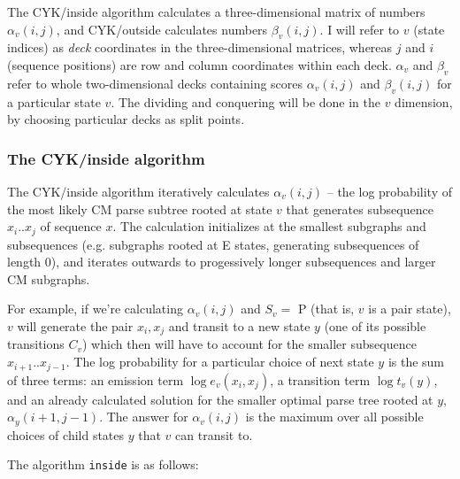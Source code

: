 \documentclass[11pt]{article}
\begin{document}
The CYK/inside algorithm calculates a three-dimensional matrix of
numbers $\alpha_v(i,j)$, and CYK/outside calculates numbers
$\beta_v(i,j)$. I will refer to $v$ (state indices) as \emph{deck}
coordinates in the three-dimensional matrices, whereas $j$ and $i$
(sequence positions) are row and column coordinates within each deck.
$\alpha_{v}$ and $\beta_{v}$ refer to whole two-dimensional decks
containing scores $\alpha_v(i,j)$ and $\beta_v(i,j)$ for a particular
state $v$. The dividing and conquering will be done in the $v$
dimension, by choosing particular decks as split points.

\subsubsection{The CYK/inside algorithm}

The CYK/inside algorithm iteratively calculates $\alpha_v(i,j)$ -- the
log probability of the most likely CM parse subtree rooted at state
$v$ that generates subsequence $x_i..x_j$ of sequence $x$. The
calculation initializes at the smallest subgraphs and subsequences
(e.g. subgraphs rooted at E states, generating subsequences of length
0), and iterates outwards to progessively longer subsequences and
larger CM subgraphs.

For example, if we're calculating $\alpha_v(i,j)$ and $S_v =$ P (that
is, $v$ is a pair state), $v$ will generate the pair $x_i,x_j$ and
transit to a new state $y$ (one of its possible transitions $C_v$)
which then will have to account for the smaller subsequence
$x_{i+1}..x_{j-1}$. The log probability for a particular choice of
next state $y$ is the sum of three terms: an emission term $\log
e_v(x_i,x_j)$, a transition term $\log t_v(y)$, and an already
calculated solution for the smaller optimal parse tree rooted at $y$,
$\alpha_y(i+1,j-1)$. The answer for $\alpha_v(i,j)$ is the maximum
over all possible choices of child states $y$ that $v$ can transit to.

The algorithm \texttt{inside} is as follows:
\end{document}
